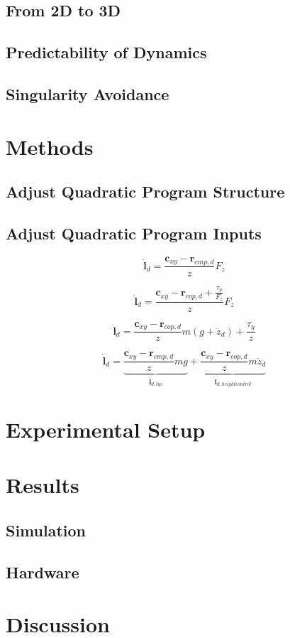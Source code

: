 \subsection{From 2D to 3D}
\subsection{Predictability of Dynamics}
\subsection{Singularity Avoidance}

\section{Methods}
\subsection{Adjust Quadratic Program Structure}
\subsection{Adjust Quadratic Program Inputs}

\begin{equation}
\dot{\mathbf{l}}_d=\frac{\mathbf{c}_{xy}-\mathbf{r}_{cmp,d}}{z}F_z
\end{equation}

\begin{equation}
\dot{\mathbf{l}}_d=\frac{\mathbf{c}_{xy}-\mathbf{r}_{cop,d}+\frac{\tau_y}{F_z}}{z}F_z
\end{equation}

\begin{equation}
\dot{\mathbf{l}}_d=\frac{\mathbf{c}_{xy}-\mathbf{r}_{cop,d}}{z}m(g+\ddot{z}_d) + \frac{\tau_y}{z}
\end{equation}
 
 \begin{equation}
\dot{\mathbf{l}}_d=\underbrace{ \frac{\mathbf{c}_{xy}-\mathbf{r}_{cmp,d}} {z}mg}_{\dot{\mathbf{l}}_{d,lip}}  + \underbrace{\frac{\mathbf{c}_{xy}-\mathbf{r}_{cop,d}}{z}m\ddot{z}_d}_{\dot{\mathbf{l}}_{d,heightcontrol}}
\end{equation}
\section{Experimental Setup}


\section{Results}
\subsection{Simulation}
\subsection{Hardware}

\section{Discussion}
